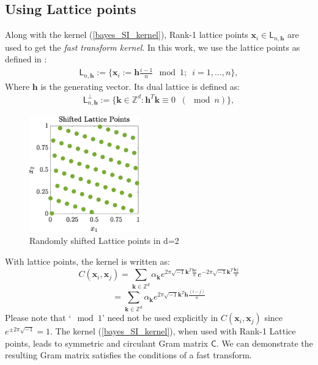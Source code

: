 \documentclass[twocolumn]{svjour3}          %
\newcommand{\bm}[1]{\boldsymbol{#1}}
\newcommand{\vh}{\bm{h}}
\newcommand{\vk}{\bm{k}}
\newcommand{\vx}{\bm{x}}
\newcommand{\mC}{\mathsf{C}}
\begin{document}
\subsection{Using Lattice points}
Along with the kernel (\ref{bayes_SI_kernel}), Rank-1 lattice points $\vx_i \in \mathsf{L}_{n,\bm{h}}$ are used to get the \textit{fast transform kernel}. 
In this work, we use the lattice points as defined in \cite{Rank1Lattice}:
\begin{align*}
\mathsf{L}_{n,\bm{h}} := \lbrace \vx_i :=  \bm{h} \frac{ i-1}{n} \mod 1 ;\ \; i=1,\hdots,n
\rbrace,
\end{align*}
Where $\bm{h}$ is the generating vector.
Its dual lattice is defined as:
\begin{align*}
\mathsf{L}_{n,\bm{h}}^{\perp } := 
\lbrace 
\vk \in \mathbb{Z}^d : \vh^T \vk \equiv 0 \;\;  (\mod n)
\rbrace,
\end{align*}



\begin{figure}[htp]
\centering
    \includegraphics[height=5cm]{ShiftedLatticePoints}
    \caption{Randomly shifted Lattice points in d=2  }
\end{figure}






With lattice points, the kernel is written as:
\[
C(\vx_i, \vx_j)
 =
\sum_{\vk \in \mathbb{Z}^d} \alpha_{\vk}  
e^{ 2 \pi\sqrt{-1} \vk^T  \frac{\bm{h} i}{n}}
e^{-2 \pi\sqrt{-1} \vk^T  \frac{\bm{h} j}{n}}
\]
\[
 =
\sum_{\vk \in \mathbb{Z}^d} \alpha_{\vk}  
e^{2 \pi\sqrt{-1} \vk^T \bm{h} \frac{(i-j)}{n}}
\]
Please note that `$\mod 1$' need not be used explicitly in $C(\vx_i, \vx_j)$ since 
$
e^{\pm 2 \pi \sqrt{-1}} = 1
$. 
The kernel (\ref{bayes_SI_kernel}), when used with Rank-1 Lattice points, leads to symmetric and circulant Gram matrix $\mC$.
We can demonstrate the resulting Gram matrix satisfies the conditions of a fast transform. 
\end{document}
